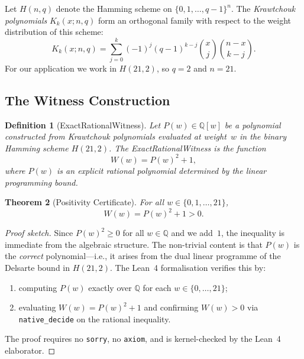 \documentclass[11pt,a4paper]{article}
\newtheorem{theorem}{Theorem}[section]
\newtheorem{definition}[theorem]{Definition}
\begin{document}
Let $H(n,q)$ denote the Hamming scheme on $\{0,1,\ldots,q-1\}^n$. The
\emph{Krawtchouk polynomials} $K_k(x; n, q)$ form an orthogonal family with
respect to the weight distribution of this scheme:
\begin{equation}\label{eq:krawtchouk}
  K_k(x; n, q) = \sum_{j=0}^{k} (-1)^j (q-1)^{k-j}
    \binom{x}{j}\binom{n-x}{k-j}.
\end{equation}
For our application we work in $H(21, 2)$, so $q = 2$ and $n = 21$.

\subsection{The Witness Construction}

\begin{definition}[ExactRationalWitness]\label{def:witness}
Let $P(w) \in \mathbb{Q}[w]$ be a polynomial constructed from Krawtchouk
polynomials evaluated at weight~$w$ in the binary Hamming scheme $H(21,2)$.
The \emph{ExactRationalWitness} is the function
\begin{equation}\label{eq:witness}
  W(w) = P(w)^2 + 1,
\end{equation}
where $P(w)$ is an explicit rational polynomial determined by the linear
programming bound.
\end{definition}

\begin{theorem}[Positivity Certificate]\label{thm:positivity}
For all $w \in \{0, 1, \ldots, 21\}$,
\[
  W(w) = P(w)^2 + 1 > 0.
\]
\end{theorem}

\begin{proof}[Proof sketch]
Since $P(w)^2 \geq 0$ for all $w \in \mathbb{Q}$ and we add~$1$, the
inequality is immediate from the algebraic structure. The non-trivial content
is that $P(w)$ is the \emph{correct} polynomial---i.e., it arises from the
dual linear programme of the Delsarte bound in $H(21,2)$. The Lean~4
formalisation verifies this by:
\begin{enumerate}
  \item computing $P(w)$ exactly over $\mathbb{Q}$ for each
    $w \in \{0,\ldots,21\}$;
  \item evaluating $W(w) = P(w)^2 + 1$ and confirming $W(w) > 0$ via
    \texttt{native\_decide} on the rational inequality.
\end{enumerate}
The proof requires no \texttt{sorry}, no \texttt{axiom}, and is
kernel-checked by the Lean~4 elaborator.
\end{proof}
\end{document}
